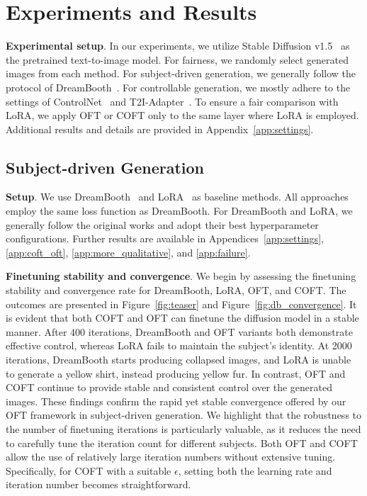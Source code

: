 \section{Experiments and Results}

\textbf{Experimental setup}. In our experiments, we utilize Stable Diffusion v1.5~\cite{rombach2022high} as the pretrained text-to-image model. For fairness, we randomly select generated images from each method. For subject-driven generation, we generally follow the protocol of DreamBooth~\cite{ruiz2023dreambooth}. For controllable generation, we mostly adhere to the settings of ControlNet~\cite{zhang2023adding} and T2I-Adapter~\cite{mou2023t2i}. To ensure a fair comparison with LoRA, we apply OFT or COFT only to the same layer where LoRA is employed. Additional results and details are provided in Appendix~\ref{app:settings}.

\subsection{Subject-driven Generation}

\textbf{Setup}. We use DreamBooth~\cite{ruiz2023dreambooth} and LoRA~\cite{hulora2022} as baseline methods. All approaches employ the same loss function as DreamBooth. For DreamBooth and LoRA, we generally follow the original works and adopt their best hyperparameter configurations. Further results are available in Appendices~\ref{app:settings}, \ref{app:coft_oft}, \ref{app:more_qualitative}, and \ref{app:failure}.

\textbf{Finetuning stability and convergence}. We begin by assessing the finetuning stability and convergence rate for DreamBooth, LoRA, OFT, and COFT. The outcomes are presented in Figure~\ref{fig:teaser} and Figure~\ref{fig:db_convergence}. It is evident that both COFT and OFT can finetune the diffusion model in a stable manner. After 400 iterations, DreamBooth and OFT variants both demonstrate effective control, whereas LoRA fails to maintain the subject’s identity. At 2000 iterations, DreamBooth starts producing collapsed images, and LoRA is unable to generate a yellow shirt, instead producing yellow fur. In contrast, OFT and COFT continue to provide stable and consistent control over the generated images. These findings confirm the rapid yet stable convergence offered by our OFT framework in subject-driven generation. We highlight that the robustness to the number of finetuning iterations is particularly valuable, as it reduces the need to carefully tune the iteration count for different subjects. Both OFT and COFT allow the use of relatively large iteration numbers without extensive tuning. Specifically, for COFT with a suitable $\epsilon$, setting both the learning rate and iteration number becomes straightforward.

